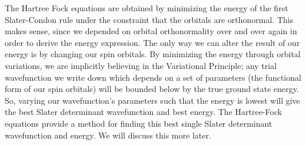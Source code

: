 \documentclass[11pt]{article}
\begin{document}
The Hartree Fock equations are obtained by minimizing the energy of the
first Slater-Condon rule under the constraint that the orbitals are
orthonormal. This makes sense, since we depended on orbital
orthonormality over and over again in order to derive the energy
expression. The only way we can alter the result of our energy is by
changing our spin orbitals. By minimizing the energy through orbital
variations, we are implicitly believing in the Variational Principle;
any trial wavefunction we write down which depends on a set of
parameters (the functional form of our spin orbitals) will be bounded
below by the true ground state energy. So, varying our wavefunction's
parameters such that the energy is lowest will give the best Slater
determinant wavefunction and best energy. The Hartree-Fock equations
provide a method for finding this best single Slater determinant
wavefunction and energy. We will discuss this more later.
\end{document}
